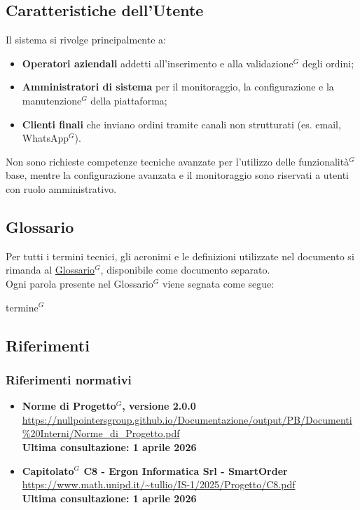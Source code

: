 	\subsection{Caratteristiche dell'Utente}
	Il sistema si rivolge principalmente a:
	\begin{itemize}
	    \item \textbf{Operatori aziendali} addetti all'inserimento e alla validazione$^G$ degli ordini;
	    \item \textbf{Amministratori di sistema} per il monitoraggio, la configurazione e la manutenzione$^G$ della piattaforma;
	    \item \textbf{Clienti finali} che inviano ordini tramite canali non strutturati (es. email, WhatsApp$^G$).
	\end{itemize}
	Non sono richieste competenze tecniche avanzate per l'utilizzo delle funzionalità$^G$ base, mentre la configurazione avanzata e il monitoraggio sono riservati a utenti con ruolo amministrativo.

	\subsection{Glossario}
	Per tutti i termini tecnici, gli acronimi e le definizioni utilizzate nel documento si rimanda al \underline{\href{https://nullpointersgroup.github.io/Documentazione/output/PB/Documenti\%20Interni/Glossario.pdf}{Glossario$^G$}}, disponibile come documento separato.\\
	Ogni parola presente nel Glossario$^G$ viene segnata come segue:
	\begin{center}
		termine$^{G}$
	\end{center}

	\subsection{Riferimenti}
	\subsubsection{Riferimenti normativi}
	\begin{itemize}[itemsep=5pt, parsep=5pt, label=$\scriptstyle\bullet$]
	
	\item \textbf{Norme di Progetto$^G$, versione 2.0.0} \\
	\url{https://nullpointersgroup.github.io/Documentazione/output/PB/Documenti%20Interni/Norme_di_Progetto.pdf}\\[3pt]
	\textbf{Ultima consultazione: 1 aprile 2026}
	
	\item \textbf{Capitolato$^G$ C8 - Ergon Informatica Srl - SmartOrder} \\
	\url{https://www.math.unipd.it/~tullio/IS-1/2025/Progetto/C8.pdf}\\[3pt]
	\textbf{Ultima consultazione: 1 aprile 2026}
	
	\end{itemize}
	

